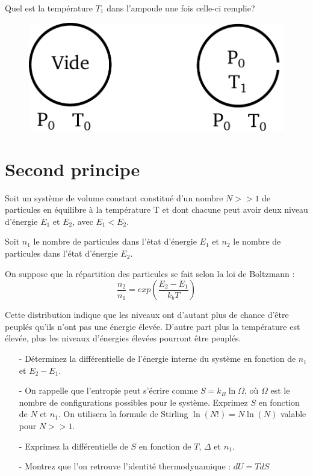 \documentclass{report}
\begin{document}
Quel est la température $T_{1}$ dans l'ampoule une fois celle-ci remplie?

\begin{figure}[!h]
\centering
\includegraphics[width=0.5\linewidth]{ampoule.pdf}
\end{figure}

\section*{Second principe}

Soit un système de volume constant constitué d'un nombre $N>>1$ de particules en équilibre à la température T et dont chacune peut avoir deux niveau d'énergie $E_{1}$ et $E_{2}$, avec $E_{1}<E_{2}$.

Soit $n_{1}$ le nombre de particules dans l'état d'énergie $E_{1}$ et $n_{2}$ le nombre de particules dans l'état d'énergie $E_{2}$.

On suppose que la répartition des particules se fait selon la loi de Boltzmann :
\begin{equation}
\frac{n_{2}}{n_{1}}=exp\left( \frac{E_{2}-E_{1}}{k_{b}T}\right) 
\end{equation}

Cette distribution indique que les niveaux ont d'autant plus de chance d'être peuplés qu'ils n'ont pas une énergie élevée. D'autre part plus la température est élevée, plus les niveaux d'énergies élevées pourront être peuplés. 

\begin{itemize}
\item[-]Déterminez la différentielle de l'énergie interne du système en fonction de $n_{1}$ et $E_{2}-E_{1}$.
\item[-]On rappelle que l'entropie peut s'écrire comme $S=k_B\ln\Omega$, où $\Omega$ est le nombre de configurations possibles pour le système. Exprimez $S$ en fonction de $N$ et $n_1$. On utilisera la formule de Stirling $\ln (N!)=N \ln (N)$ valable pour $N>>1$.
\item[-] Exprimez la différentielle de $S$ en fonction de $T$, $\Delta$ et $n_1$.
\item[-] Montrez que l'on retrouve l'identité thermodynamique : $dU = TdS$
\end{itemize}
\end{document}
